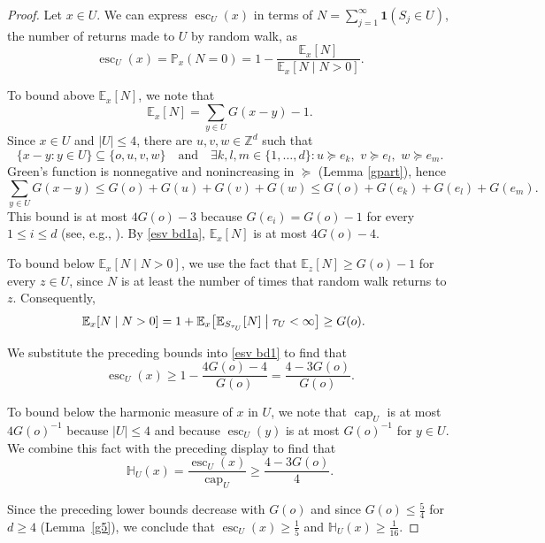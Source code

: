 \documentclass[11pt,reqno]{amsart}
\theoremstyle{definition}
\numberwithin{equation}{section}
\newcommand{\Z}{\mathbb{Z}}
\renewcommand{\P}{\mathbb{P}}
\newcommand{\E}{\mathbb{E}}
\newcommand{\1}{\mathbf{1}}
\renewcommand{\H}{\mathbb{H}}
\DeclareMathOperator{\capac}{cap}
\DeclareMathOperator{\Es}{esc}
\begin{document}
\begin{proof}
Let $x \in U$. We can express $\Es_U (x)$ in terms of $N = \sum_{j=1}^\infty \1 (S_j \in U)$, the number of returns made to $U$ by random walk, as 
\begin{equation}\label{esv bd1}
\Es_U (x) = \P_x (N=0) = 1 - \frac{\E_x [N]}{\E_x [N \mid N > 0]}.
\end{equation}

To bound above $\E_x [N]$, we note that
\begin{equation}\label{esv bd1a}
\E_x [N] = \sum_{y \in U} G(x-y) - 1.
\end{equation}
Since $x \in U$ and $|U| \leq 4$, there are $u, v, w\in \Z^d$ such that
\[
\{x - y: y \in U\} \subseteq \{o, u, v, w\} \quad \text{and} \quad \exists k,l, m \in \{1,\dots,d\}: u \succeq e_k, \,\, v \succeq e_l, \,\, w \succeq e_m.
\]
Green's function is nonnegative and nonincreasing in $\succeq$ (Lemma \ref{gpart}), hence
\begin{equation*}
\sum_{y \in U} G(x-y) \leq G(o) + G(u) + G(v) + G(w) \leq G(o) + G(e_k) + G(e_l) + G(e_m).
\end{equation*}
This bound is at most $4 G(o) - 3$ because $G(e_i) = G(o) - 1$ for every $1 \leq i \leq d$ (see, e.g., \cite[Exercise 3.2]{popov2021}). By \eqref{esv bd1a}, $\E_x [N]$ is at most $4 G(o) - 4$.

To bound below $\E_x [N \mid N>0]$, we use the fact that $\E_z [N] \geq G(o) - 1$ for every $z \in U$, since $N$ is at least the number of times that random walk returns to $z$. Consequently, 
\begin{align*}
\E_x [N \mid N > 0] & = 1 + \E_x \big[ \E_{S_{\tau_{U}}} [N] \bigm\vert \tau_{U} < \infty \big] \geq G(o).
\end{align*}

We substitute the preceding bounds into \eqref{esv bd1} to find that
\[
\Es_U (x) \geq 1 - \frac{4 G(o) - 4}{G(o)} = \frac{4 - 3G(o)}{G(o)}.
\]

To bound below the harmonic measure of $x$ in $U$, we note that $\capac_U$ is at most $4G(o)^{-1}$ because $|U| \leq 4$ and because $\Es_U (y)$ is at most $G(o)^{-1}$ for $y \in U$. We combine this fact with the preceding display to find that
\[
\H_U (x) = \frac{\Es_U (x)}{\capac_U} \geq \frac{4 - 3G(o)}{4}.
\]

Since the preceding lower bounds decrease with $G(o)$ and since $G(o) \leq \frac54$ for $d \geq 4$ (Lemma~\ref{g5}), we conclude that $\Es_U (x) \geq \frac15$ and $\H_U (x) \geq \frac{1}{16}$.
\end{proof}
\end{document}
